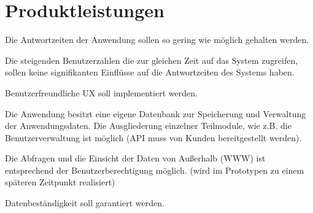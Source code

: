 	
	
	\section{Produktleistungen}
	
	\begin{description}
	\item[/L10/] Die Antwortzeiten der Anwendung sollen so gering wie möglich gehalten werden.
	\item[/L20/] 	Die steigenden Benutzerzahlen die zur gleichen Zeit auf das System zugreifen, sollen keine signifikanten Einflüsse auf die Antwortzeiten des Systems haben.
	\item[/L30/]	Benutzerfreundliche UX soll implementiert werden.
	\item[/L40/]	Die Anwendung besitzt eine eigene Datenbank zur Speicherung und Verwaltung der Anwendungsdaten.
	Die Ausgliederung einzelner Teilmodule, wie z.B. die Benutzerverwaltung ist möglich (API muss von Kunden bereitgestellt werden).
	\item[/L50/] 	Die Abfragen und die Einsicht der Daten von Außerhalb (WWW) ist entsprechend der Benutzerberechtigung möglich. (wird im Prototypen zu einem späteren Zeitpunkt realisiert)
	\item[/L60/] 	Datenbeständigkeit soll garantiert werden.
	\end{description}


	
